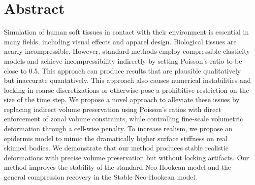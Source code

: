 
\chapter{Abstract}

Simulation of human soft tissues in contact with their environment
is essential in many fields, including visual effects and apparel
design.  Biological tissues are nearly incompressible. However,
standard methods employ compressible elasticity models and achieve
incompressibility indirectly by setting Poisson's ratio to be close
to 0.5.  This approach can produce results that are plausible
qualitatively but inaccurate quantatively. This approach also causes
numerical instabilities and locking in coarse discretizations or
otherwise pose a prohibitive restriction on the size of the time
step.
%
We propose a novel approach to alleviate these issues by
replacing indirect volume preservation using Poisson's ratios with
direct enforcement of zonal volume constraints, while controlling
fine-scale volumetric deformation through a cell-wise penalty.
To increase realism, we propose an epidermis model to mimic the
dramatically higher surface stiffness on real skinned bodies.
We demonstrate that our method produces stable realistic
deformations with precise volume preservation but without locking
artifacts. Our method improves the stability of the standard
Neo-Hookean model and the general compression recovery in the Stable
Neo-Hookean model.


